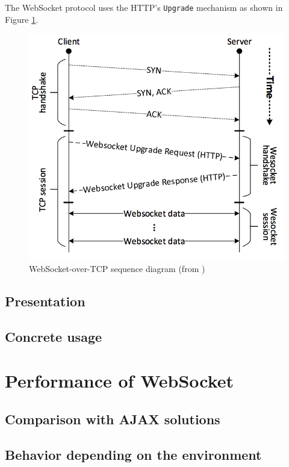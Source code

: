 \documentclass[journal,compsoc]{IEEEtran}
\newcommand{\ttt}[1]{\texttt{#1}}
\newcommand{\ws}{WebSocket}
\begin{document}
The \ws{} protocol uses the HTTP's \ttt{Upgrade} mechanism as shown in Figure \ref{fig:websocket_connection}.

\begin{figure}
    \centering
    \label{fig:websocket_connection}
    \includegraphics[width=\linewidth]{websocket_tcp_diagram.png}
    \caption{\ws-over-TCP sequence diagram (from \cite{performanceEvaluationOfWebsocketProtocol})}
\end{figure}


\subsection{Presentation}

\subsection{Concrete usage}



\section{Performance of \ws}

\subsection{Comparison with AJAX solutions}

\subsection{Behavior depending on the environment}
\end{document}
